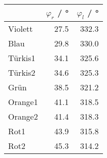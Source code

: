 \begin{tabular}{lrr}
	\toprule
	{}      & $\varphi_r$ / \si{\degree} & $\varphi_l$ / \si{\degree} \\
	\midrule
	Violett & 27.5                       & 332.3                      \\
	Blau    & 29.8                       & 330.0                      \\
	Türkis1 & 34.1                       & 325.6                      \\
	Türkis2 & 34.6                       & 325.3                      \\
	Grün    & 38.5                       & 321.2                      \\
	Orange1 & 41.1                       & 318.5                      \\
	Orange2 & 41.4                       & 318.3                      \\
	Rot1    & 43.9                       & 315.8                      \\
	Rot2    & 45.3                       & 314.2                      \\
	\bottomrule
\end{tabular}
